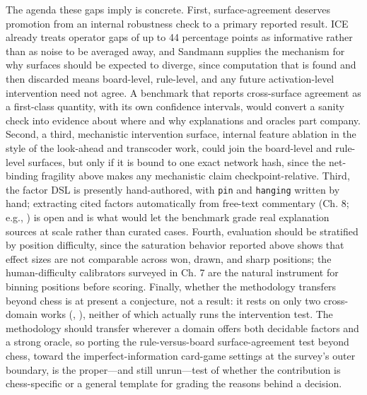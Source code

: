 \documentclass[conference]{IEEEtran}
\begin{document}
The agenda these gaps imply is concrete. First, surface-agreement deserves promotion from an internal robustness check to a primary reported result. ICE \cite{ref17} already treats operator gaps of up to 44 percentage points as informative rather than as noise to be averaged away, and Sandmann \cite{ref5} supplies the mechanism for why surfaces should be expected to diverge, since computation that is found and then discarded means board-level, rule-level, and any future activation-level intervention need not agree. A benchmark that reports cross-surface agreement as a first-class quantity, with its own confidence intervals, would convert a sanity check into evidence about where and why explanations and oracles part company. Second, a third, mechanistic intervention surface, internal feature ablation in the style of the look-ahead and transcoder work, could join the board-level and rule-level surfaces, but only if it is bound to one exact network hash, since the net-binding fragility above makes any mechanistic claim checkpoint-relative. Third, the factor DSL is presently hand-authored, with \texttt{pin} and \texttt{hanging} written by hand; extracting cited factors automatically from free-text commentary (Ch. 8; e.g., \cite{ref12}) is open and is what would let the benchmark grade real explanation sources at scale rather than curated cases. Fourth, evaluation should be stratified by position difficulty, since the saturation behavior reported above shows that effect sizes are not comparable across won, drawn, and sharp positions; the human-difficulty calibrators surveyed in Ch. 7 are the natural instrument for binning positions before scoring. Finally, whether the methodology transfers beyond chess is at present a conjecture, not a result: it rests on only two cross-domain works (\cite{ref57}, \cite{ref58}), neither of which actually runs the intervention test. The methodology should transfer wherever a domain offers both decidable factors and a strong oracle, so porting the rule-versus-board surface-agreement test beyond chess, toward the imperfect-information card-game settings at the survey's outer boundary, is the proper---and still unrun---test of whether the contribution is chess-specific or a general template for grading the reasons behind a decision.
\end{document}
